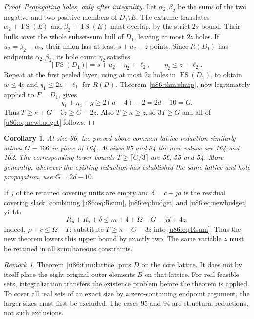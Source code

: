 \documentclass[11pt,a4paper]{article}
\newtheorem{corollary}[theorem]{Corollary}
\theoremstyle{remark}
\newtheorem{remark}[theorem]{Remark}
\newcommand{\FS}{\operatorname{FS}}
\begin{document}
\begin{proof}
\emph{Propagating holes, only after integrality.}
Let $\alpha_2,\beta_2$ be the sums of the two negative and two positive
members of $D_1\setminus E$. The extreme translates
$\alpha_2+\FS(E)$ and $\beta_2+\FS(E)$ must overlap, by the strict
$2s$ bound. Their hulls cover the whole subset-sum hull of $D_1$, leaving
at most $2z$ holes. If $u_2=\beta_2-\alpha_2$, their union has at least
$s+u_2-z$ points. Since $R(D_1)$ has endpoints $\alpha_2,\beta_2$, its
hole count $\eta_2$ satisfies
\[
 |\FS(D_1)|=s+u_2-\eta_2+\ell_2,
 \qquad\eta_2\le z+\ell_2.
\]
Repeat at the first peeled layer, using at most $2z$ holes in
$\FS(D_1)$, to obtain $w\le4z$ and $\eta_1\le2z+\ell_1$ for $R(D)$.
Theorem~\ref{u86:thm:sharp}, now legitimately applied to $F=D_1$, gives
\[
 \eta_1+\eta_2+g\ge2(d-4)-2=2d-10=G.
\]
Thus $T\ge\kappa+G-3z\ge G-2z$. Also $T\ge\kappa\ge z$, so
$3T\ge G$ and all of \eqref{u86:eq:newbudget} follows.
\end{proof}

\begin{corollary}\label{u86:cor:budgets}
At size 96, the proved above common-lattice reduction similarly
allows $G=166$ in place of 164. At sizes 95 and 94 the new values are 164
and 162. The corresponding lower bounds $T\ge\lceil G/3\rceil$ are
56, 55 and 54. More generally, wherever the existing reduction has
established the same lattice and hole propagation, use $G=2d-10$.
\end{corollary}
If $j$ of the retained covering units are empty and $\delta=c-jd$ is
the residual covering slack, combining \eqref{u86:eq:Rsum},
\eqref{u86:eq:budget} and \eqref{u86:eq:newbudget} yields
\begin{equation}\label{u86:eq:joint}
 R_p+R_q+\delta\le m+4+\Omega-G-jd+4z.
\end{equation}
Indeed, $\rho+c\le\Omega-T$; substitute
$T\ge\kappa+G-3z$ into \eqref{u86:eq:Rsum}. Thus the new theorem lowers
this upper bound by exactly two. The same variable $z$ must be retained
in all simultaneous constraints.

\begin{remark}
Theorem~\ref{u86:thm:lattice} puts $D$ on the core lattice. It does not by
itself place the eight original outer elements $B$ on that lattice.
For real feasible sets, integralization transfers the existence problem
before the theorem is applied. To cover all real sets of an exact size by
a zero-containing endpoint argument, the larger sizes must first be
excluded. The cases 95 and 94 are structural reductions, not such
exclusions.
\end{remark}
\end{document}
